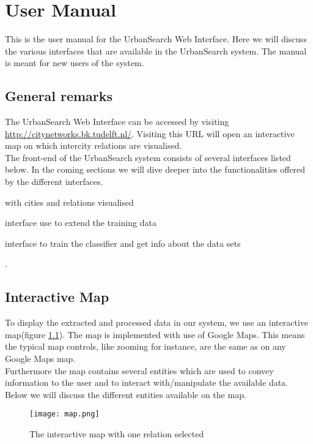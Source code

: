\chapter{User Manual}
This is the user manual for the UrbanSearch Web Interface. Here we will discuss the various interfaces that are available in the UrbanSearch system. The manual is meant for new users of the system.

\section{General remarks}
The UrbanSearch Web Interface can be accessed by visiting \url{http://citynetworks.bk.tudelft.nl/}. Visiting this URL will open an interactive map on which intercity relations are visualised.\\
The front-end of the UrbanSearch system consists of several interfaces listed below. In the coming sections we will dive deeper into the functionalities offered by the different interfaces.

\begin{description}[align=left]
\item [Interactive Map] with cities and relations visualised
\item [Classification] interface use to extend the training data
\item [Classifier] interface to train the classifier and get info about the data sets
\end{description}. 


\section{Interactive Map}

To display the extracted and processed data in our system, we use an interactive map(figure \ref{fig:map}). The map is implemented with use of Google Maps. This means the typical map controls, like zooming for instance, are the same as on any Google Maps map.\\
Furthermore the map contains several entities which are used to convey information to the user and to interact with/manipulate the available data.\\
Below we will discuss the different entities available on the map.
\begin{figure}[H]
    \centering
    \texttt{[image: map.png]}
    \caption{The interactive map with one relation selected}
    \label{fig:map}
\end{figure}

